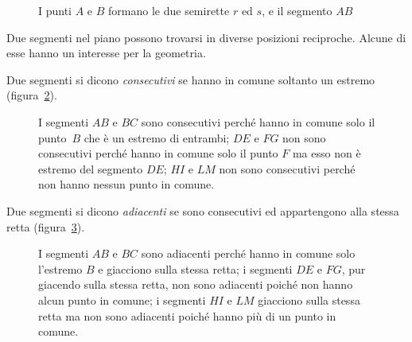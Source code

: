 \begin{inaccessibleblock}
 \begin{figure}[bth]
 \centering 
 \caption{I punti \(A\) e \(B\) formano le due semirette \(r\) ed \(s\), e il 
segmento \(AB\)}\label{fig:1.13}
\end{figure}
\end{inaccessibleblock}

Due segmenti nel piano possono trovarsi in diverse posizioni 
reciproche. Alcune di esse hanno un interesse per la geometria.
\begin{definizione}
Due segmenti si dicono \emph{consecutivi} se hanno in comune soltanto 
un estremo (figura~\ref{fig:1.14}).
\end{definizione}

\begin{inaccessibleblock}
 \begin{figure}[bth]
 \centering 
 \caption{I segmenti \(AB\) e \(BC\) sono consecutivi perché hanno in 
comune solo il punto~\(B\) che è un estremo di entrambi; \(DE\) e \(FG\) 
non sono consecutivi perché hanno in comune solo il punto \(F\) ma esso 
non è estremo del segmento \(DE\); \(HI\) e \(LM\) non sono consecutivi 
perché non hanno nessun punto in comune.}\label{fig:1.14}
\end{figure}
\end{inaccessibleblock}

\begin{definizione}
Due segmenti si dicono \emph{adiacenti} se sono consecutivi ed 
appartengono alla stessa retta (figura~\ref{fig:1.15}).
\end{definizione}

\begin{inaccessibleblock}
 \begin{figure}[tbh]
 \centering 
 \caption{I segmenti \(AB\) e \(BC\) sono adiacenti perché hanno in 
comune solo l'estremo \(B\) e giacciono sulla stessa retta; i segmenti 
\(DE\) e \(FG\), pur giacendo sulla stessa retta, non sono adiacenti 
poiché non hanno alcun punto in comune; i segmenti \(HI\) e \(LM\) 
giacciono sulla stessa retta ma non sono adiacenti poiché hanno più 
di un punto in comune.}\label{fig:1.15}
\end{figure}
\end{inaccessibleblock}

\ovalbox{\risolvii \ref{ese:1.43}, \ref{ese:1.44}, \ref{ese:1.45}, 
\ref{ese:1.46}, \ref{ese:1.47}, \ref{ese:1.48}, \ref{ese:1.49}, 
\ref{ese:1.50}}

